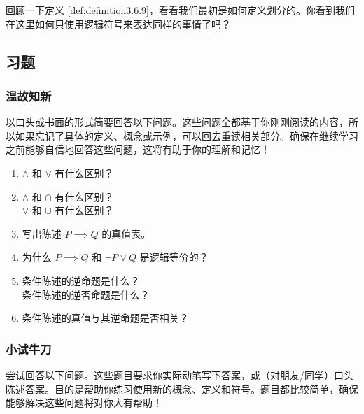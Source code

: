 回顾一下定义 \ref{def:definition3.6.9}，看看我们最初是如何定义划分的。你看到我们在这里如何只使用逻辑符号来表达同样的事情了吗？

\clearpage

\subsection{习题}

\subsubsection*{温故知新}

以口头或书面的形式简要回答以下问题。这些问题全都基于你刚刚阅读的内容，所以如果忘记了具体的定义、概念或示例，可以回去重读相关部分。确保在继续学习之前能够自信地回答这些问题，这将有助于你的理解和记忆！

\begin{enumerate}[label=(\arabic*)]
    \item $\land$ 和 $\lor$ 有什么区别？
    \item $\land$ 和 $\cap$ 有什么区别？\\
        $\lor$ 和 $\cup$ 有什么区别？
    \item 写出陈述 $P \implies Q$ 的真值表。
    \item 为什么 $P \implies Q$ 和 $\neg P \lor Q$ 是逻辑等价的？
    \item 条件陈述的逆命题是什么？\\
        条件陈述的逆否命题是什么？
    \item 条件陈述的真值与其逆命题是否相关？
\end{enumerate}

\subsubsection*{小试牛刀}

尝试回答以下问题。这些题目要求你实际动笔写下答案，或（对朋友/同学）口头陈述答案。目的是帮助你练习使用新的概念、定义和符号。题目都比较简单，确保能够解决这些问题将对你大有帮助！

